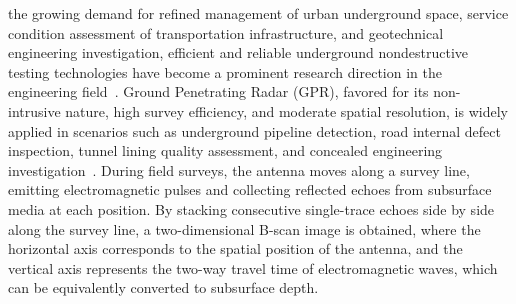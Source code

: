 \documentclass[lettersize,journal]{IEEEtran}
\begin{document}




 the growing demand for refined management of urban underground space, 
service condition assessment of transportation infrastructure, and geotechnical engineering investigation, 
efficient and reliable underground nondestructive testing technologies have become a prominent research 
direction in the engineering field~\cite{lai2018review}. 
Ground Penetrating Radar (GPR), favored for its non-intrusive nature, high survey efficiency, and moderate spatial resolution, 
is widely applied in scenarios such as underground pipeline detection, road internal defect inspection, tunnel lining quality assessment, 
and concealed engineering investigation~\cite{rasol2022road,travassos2021review}. 
During field surveys, the antenna moves along a survey line, 
emitting electromagnetic pulses and collecting reflected echoes from subsurface media at each position. 
By stacking consecutive single-trace echoes side by side along the survey line, 
a two-dimensional B-scan image is obtained, where the horizontal axis corresponds to the spatial position of the antenna, 
and the vertical axis represents the two-way travel time of electromagnetic waves, 
which can be equivalently converted to subsurface depth.
\end{document}
